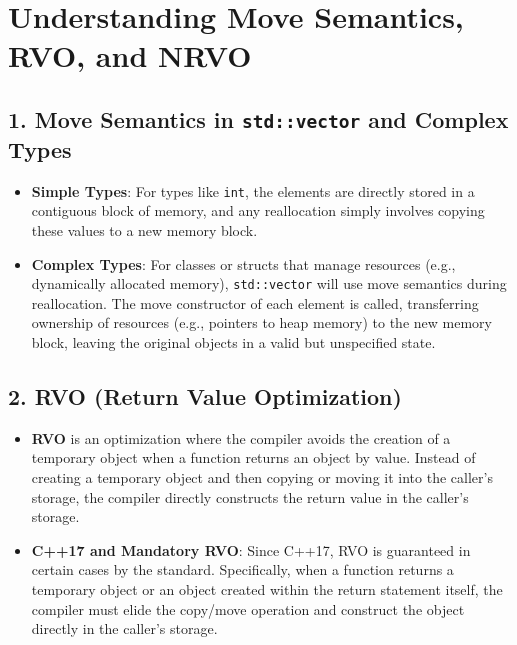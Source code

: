 \documentclass{article}
\begin{document}
\section*{Understanding Move Semantics, RVO, and NRVO}

\subsection*{1. Move Semantics in \texttt{std::vector} and Complex Types}
\begin{itemize}
    \item \textbf{Simple Types}: For types like \texttt{int}, the elements are directly stored in a contiguous block of memory, and any reallocation simply involves copying these values to a new memory block.
    \item \textbf{Complex Types}: For classes or structs that manage resources (e.g., dynamically allocated memory), \texttt{std::vector} will use move semantics during reallocation. The move constructor of each element is called, transferring ownership of resources (e.g., pointers to heap memory) to the new memory block, leaving the original objects in a valid but unspecified state.
\end{itemize}

\subsection*{2. RVO (Return Value Optimization)}
\begin{itemize}
    \item \textbf{RVO} is an optimization where the compiler avoids the creation of a temporary object when a function returns an object by value. Instead of creating a temporary object and then copying or moving it into the caller's storage, the compiler directly constructs the return value in the caller's storage.
    \item \textbf{C++17 and Mandatory RVO}: Since C++17, RVO is guaranteed in certain cases by the standard. Specifically, when a function returns a temporary object or an object created within the return statement itself, the compiler must elide the copy/move operation and construct the object directly in the caller's storage.
\end{itemize}
\end{document}
